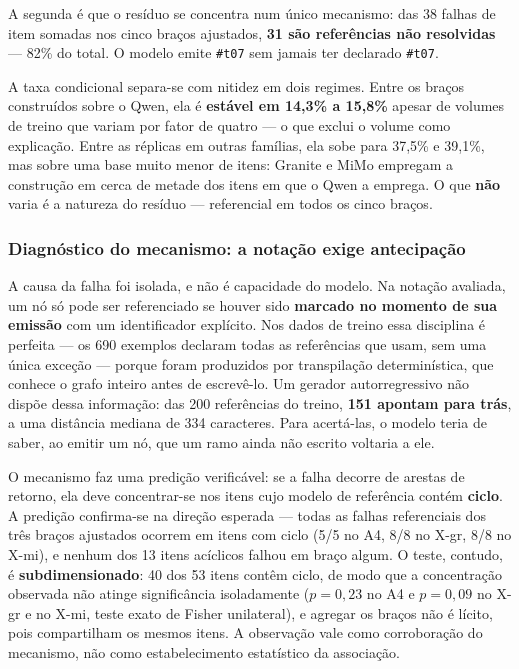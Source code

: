A segunda é que o resíduo se concentra num único mecanismo: das 38 falhas de item somadas nos cinco braços ajustados, \textbf{31 são referências não resolvidas} --- 82\% do total. O modelo emite \verb|#t07| sem jamais ter declarado \verb|#t07|.

A taxa condicional separa-se com nitidez em dois regimes. Entre os braços construídos sobre o Qwen, ela é \textbf{estável em 14,3\% a 15,8\%} apesar de volumes de treino que variam por fator de quatro --- o que exclui o volume como explicação. Entre as réplicas em outras famílias, ela sobe para 37,5\% e 39,1\%, mas sobre uma base muito menor de itens: Granite e MiMo empregam a construção em cerca de metade dos itens em que o Qwen a emprega. O que \textbf{não} varia é a natureza do resíduo --- referencial em todos os cinco braços.

\subsubsection*{Diagnóstico do mecanismo: a notação exige antecipação}

A causa da falha foi isolada, e não é capacidade do modelo. Na notação avaliada, um nó só pode ser referenciado se houver sido \textbf{marcado no momento de sua emissão} com um identificador explícito. Nos dados de treino essa disciplina é perfeita --- os 690 exemplos declaram todas as referências que usam, sem uma única exceção --- porque foram produzidos por transpilação determinística, que conhece o grafo inteiro antes de escrevê-lo. Um gerador autorregressivo não dispõe dessa informação: das 200 referências do treino, \textbf{151 apontam para trás}, a uma distância mediana de 334 caracteres. Para acertá-las, o modelo teria de saber, ao emitir um nó, que um ramo ainda não escrito voltaria a ele.

O mecanismo faz uma predição verificável: se a falha decorre de arestas de retorno, ela deve concentrar-se nos itens cujo modelo de referência contém \textbf{ciclo}. A predição confirma-se na direção esperada --- todas as falhas referenciais dos três braços ajustados ocorrem em itens com ciclo (5/5 no A4, 8/8 no X-gr, 8/8 no X-mi), e nenhum dos 13 itens acíclicos falhou em braço algum. O teste, contudo, é \textbf{subdimensionado}: 40 dos 53 itens contêm ciclo, de modo que a concentração observada não atinge significância isoladamente ($p = 0{,}23$ no A4 e $p = 0{,}09$ no X-gr e no X-mi, teste exato de Fisher unilateral), e agregar os braços não é lícito, pois compartilham os mesmos itens. A observação vale como corroboração do mecanismo, não como estabelecimento estatístico da associação.

